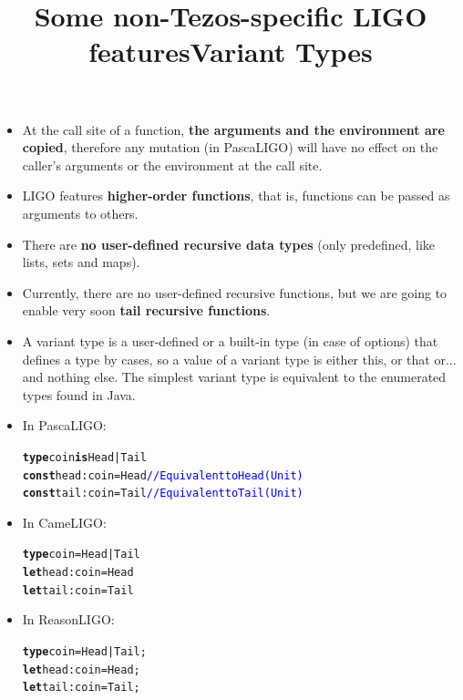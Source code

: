 \documentclass[wide]{slides}
\newcommand{\Kconst}[0]{\textbf{const}\xspace}
\newcommand{\Kis}[0]{\textbf{is}\xspace}
\newcommand{\Ktype}[0]{\textbf{type}\xspace}
\newcommand{\Klet}[0]{\textbf{let}\xspace}
\newcommand{\com}[1]{\textcolor{blue}{{#1}}}
\begin{document}
\begin{slide}
  \title{Some non-Tezos-specific LIGO features}

  \begin{itemize}

    \item At the call site of a function, \textbf{the arguments and
      the environment are copied}, therefore any mutation (in
      PascaLIGO) will have no effect on the caller's arguments or the
      environment at the call site.

    \item LIGO features \textbf{higher-order functions}, that is,
      functions can be passed as arguments to others.

    \item There are \textbf{no user-defined recursive data types}
      (only predefined, like lists, sets and maps).

    \item Currently, there are no user-defined recursive functions,
      but we are going to enable very soon \textbf{tail recursive
        functions}.

  \end{itemize}

\end{slide}

\begin{slide}
  \title{Variant Types}

  \begin{itemize}

    \item A variant type is a user-defined or a built-in type (in case
      of options) that defines a type by cases, so a value of a
      variant type is either this, or that or... and nothing else. The
      simplest variant type is equivalent to the enumerated types
      found in Java.

    \item In PascaLIGO:
      \begin{alltt}
\Ktype coin \Kis Head | Tail
\Kconst head : coin = Head \com{// Equivalent to Head (Unit)}
\Kconst tail : coin = Tail \com{// Equivalent to Tail (Unit)}
      \end{alltt}

      \vspace{-5mm}
    \item In CameLIGO:
      \begin{alltt}
\Ktype coin = Head | Tail
\Klet head : coin = Head
\Klet tail : coin = Tail
      \end{alltt}

      \vspace{-5mm}
    \item In ReasonLIGO:
      \begin{alltt}
\Ktype coin = Head | Tail;
\Klet head : coin = Head;
\Klet tail : coin = Tail;
      \end{alltt}

  \end{itemize}

\end{slide}
\end{document}
